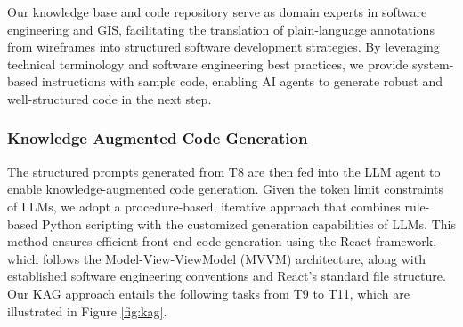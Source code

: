 Our knowledge base and code repository serve as domain experts in software engineering and GIS, facilitating the translation of plain-language annotations from wireframes into structured software development strategies. By leveraging technical terminology and software engineering best practices, we provide system-based instructions with sample code, enabling AI agents to generate robust and well-structured code in the next step.
 

\subsubsection{Knowledge Augmented Code Generation}
\label{subsec:simulations3}
The structured prompts generated from T8 are then fed into the LLM agent to enable knowledge-augmented code generation. Given the token limit constraints of LLMs, we adopt a procedure-based, iterative approach that combines rule-based Python scripting with the customized generation capabilities of LLMs. This method ensures efficient front-end code generation using the React framework, which follows the Model-View-ViewModel (MVVM) architecture, along with established software engineering conventions and React’s standard file structure. Our KAG approach entails the following tasks from T9 to T11, which are illustrated in Figure \ref{fig:kag}. 

